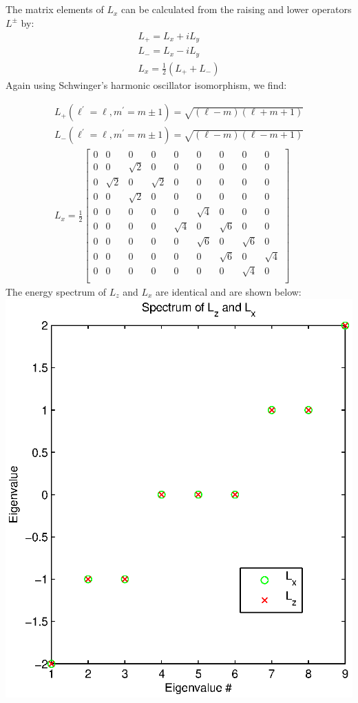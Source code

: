 \documentclass[a4paper,12pt]{article}
\numberwithin{equation}{section}
\begin{document}
\subsection{}
The matrix elements of $L_x$ can be calculated from the raising and lower operators $L^{\pm}$ by:
\begin{gather}
 L_+=L_x+iL_y\\
 L_-=L_x-iL_y\\
 L_x=\frac{1}{2}(L_++L_-)
\end{gather}
Again using Schwinger's harmonic oscillator isomorphism, we find:

\begin{gather}
L_+(\ell^{'}=\ell, m^{'}=m \pm 1)=\sqrt{(\ell-m)(\ell+m+1)}\\
L_-(\ell^{'}=\ell, m^{'}=m \pm 1)=\sqrt{(\ell-m)(\ell-m+1)}\\
L_x=\frac{1}{2}
\begin{bmatrix}
 0 & 0 & 0 & 0 & 0 & 0 & 0 & 0 & 0 \\
 0 & 0 & \sqrt{2} & 0 & 0 & 0 & 0 & 0 & 0 \\
 0 & \sqrt{2} & 0 & \sqrt{2} & 0 & 0 & 0 & 0 & 0 \\
 0 & 0 & \sqrt{2} & 0 & 0 & 0 & 0 & 0 & 0 \\
 0 & 0 & 0 & 0 & 0 & \sqrt{4} & 0 & 0 & 0 \\
 0 & 0 & 0 & 0 & \sqrt{4} & 0 & \sqrt{6} & 0 & 0 \\
 0 & 0 & 0 & 0 & 0 & \sqrt{6} & 0 & \sqrt{6} & 0 \\
 0 & 0 & 0 & 0 & 0 & 0 & \sqrt{6} & 0 & \sqrt{4} \\
 0 & 0 & 0 & 0 & 0 & 0 & 0 & \sqrt{4} & 0 \\
\end{bmatrix}
\end{gather}
The energy spectrum of $L_z$ and $L_x$ are identical and are shown below:\\
\includegraphics{Lx_Lz}
\end{document}
